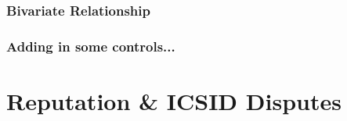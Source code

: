 \documentclass[10pt]{beamer}
\begin{document}


\begin{frame}
\frametitle{Bivariate Relationship}

\begin{figure}[ht]
	\centering
	\resizebox{1\textwidth}{!}{}	
\end{figure}

\end{frame}

\begin{frame}
\frametitle{Adding in some controls...}

\begin{figure}[ht]
	\centering
	\vspace{-5mm}
	\resizebox{1\textwidth}{!}{}	
\end{figure}

\end{frame}

\section{Reputation \& ICSID Disputes}
\end{document}
